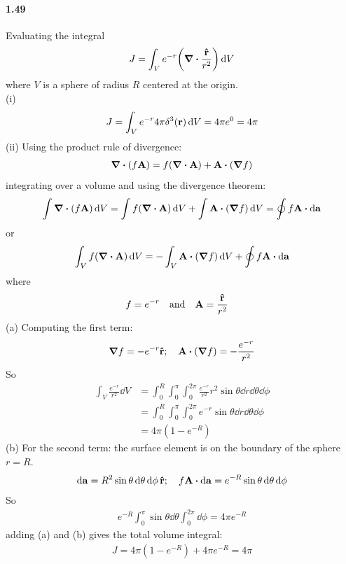 \documentclass[../main.tex]{subfiles}
\begin{document}
\paragraph{1.49}
Evaluating the integral
\begin{align*}
    J = \int_V e^{-r} \qt(\div{\frac{\vu{r}}{r^2}}) \dd{V}
\end{align*}
where $V$ is a sphere of radius $R$ centered at the origin. \\
(i)
\begin{align*}
    J = \int_V e^{-r} 4\pi \delta^3(\vb{r}) \dd{V} = 4\pi e^{0} = 4\pi
\end{align*}
(ii) Using the product rule of divergence:
\begin{align*}
    \div(f\vb{A}) = f (\div \vb{A}) + \vb{A} \vdot (\grad{f})
\end{align*}
integrating over a volume and using the divergence theorem:
\begin{align*}
    \int \div(f\vb{A}) \dd{V} = \int f (\div \vb{A}) \dd{V}+ \int \vb{A} \vdot (\grad{f}) \dd{V}
    = \oint f\vb{A} \vdot \dd{\vb{a}}
\end{align*}
or 
\begin{align*}
    \int_V f (\div \vb{A}) \dd{V} = - \int_V \vb{A} \vdot (\grad f) \dd{V}
        + \oint f \vb{A} \vdot \dd{\vb{a}}
\end{align*}
where
\begin{align*}
    f = e^{-r} &\qand \vb{A} = \frac{\vu{r}}{r^2}
\end{align*}
(a) Computing the first term:
\begin{align*}
    \grad{f} = -e^{-r} \vu{r} ;\quad \vb{A} \vdot (\grad f) = -\frac{e^{-r}}{r^2}
\end{align*}
So
\begin{align*}
    \int_V \frac{e^{-r}}{r^2} \dd{V} &= \int_0^R \int_0^{\pi} \int_0^{2\pi} \frac{e^{-r}}{r^2}
        r^2 \sin\theta \dd{r} \dd{\theta} \dd{\phi} \\
    &= \int_0^R \int_0^{\pi} \int_0^{2\pi} e^{-r}
    \sin\theta \dd{r} \dd{\theta} \dd{\phi} \\
    &= 4\pi (1 - e^{-R})
\end{align*}
(b) For the second term: the surface element is on the boundary of the sphere $r = R$. 
\begin{align*}
    \dd{\vb{a}} = R^2 \sin\theta \dd{\theta} \dd{\phi} \vu{r}; \quad
    f \vb{A} \vdot \dd{\vb{a}} = e^{-R} \sin\theta \dd{\theta} \dd{\phi}
\end{align*}
So
\begin{align*}
    e^{-R} \int_0^{\pi} \sin\theta \dd{\theta} \int_0^{2\pi} \dd{\phi} = 4\pi e^{-R}
\end{align*}
adding (a) and (b) gives the total volume integral:
\begin{align*}
    J = 4\pi (1 - e^{-R}) + 4\pi e^{-R} = 4\pi
\end{align*}
\end{document}
